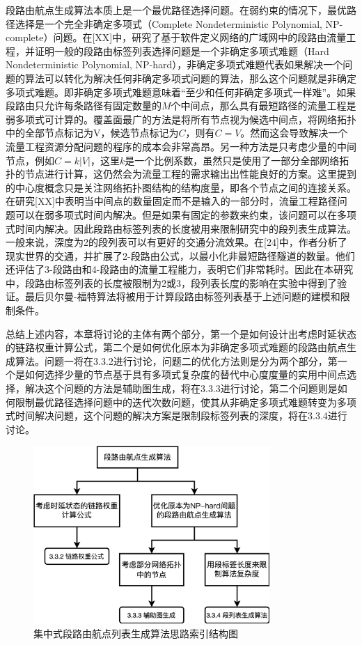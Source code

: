 段路由航点生成算法本质上是一个最优路径选择问题。在弱约束的情况下，最优路径选择是一个完全非确定多项式（Complete Nondeterministic Polynomial, NP-complete）问题。在[XX]中，研究了基于软件定义网络的广域网中的段路由流量工程，并证明一般的段路由标签列表选择问题是一个非确定多项式难题（Hard Nondeterministic Polynomial, NP-hard），非确定多项式难题代表如果解决一个问题的算法可以转化为解决任何非确定多项式问题的算法，那么这个问题就是非确定多项式难题。即非确定多项式难题意味着“至少和任何非确定多项式一样难”。如果段路由只允许每条路径有固定数量的$M$个中间点，那么具有最短路径的流量工程是弱多项式可计算的。覆盖面最广的方法是将所有节点视为候选中间点，将网络拓扑中的全部节点标记为V，候选节点标记为$C$，则有$C = V$。然而这会导致解决一个流量工程资源分配问题的程序的成本会非常高昂。另一种方法是只考虑少量的中间节点，例如$C=k|V|$，这里$k$是一个比例系数，虽然只是使用了一部分全部网络拓扑的节点进行计算，这仍然会为流量工程的需求输出出性能良好的方案。这里提到的中心度概念只是关注网络拓扑图结构的结构度量，即各个节点之间的连接关系。在研究[XX]中表明当中间点的数量固定而不是输入的一部分时，流量工程路径问题可以在弱多项式时间内解决。但是如果有固定的参数来约束，该问题可以在多项式时间内解决。因此段路由标签列表的长度被用来限制研究中的段列表生成算法。一般来说，深度为2的段列表可以有更好的交通分流效果。在[24]中，作者分析了现实世界的交通，并扩展了2-段路由公式，以最小化非最短路径隧道的数量。他们还评估了3-段路由和4-段路由的流量工程能力，表明它们非常耗时。因此在本研究中，段路由标签列表的长度被限制为2或3，段列表长度的影响在实验中得到了验证。最后贝尔曼-福特算法将被用于计算段路由标签列表基于上述问题的建模和限制条件。

总结上述内容，本章将讨论的主体有两个部分，第一个是如何设计出考虑时延状态的链路权重计算公式，第二个是如何优化原本为非确定多项式难题的段路由航点生成算法。问题一将在3.3.2进行讨论，问题二的优化方法则是分为两个部分，第一个是如何选择少量的节点基于具有多项式复杂度的替代中心度度量的实用中间点选择，解决这个问题的方法是辅助图生成，将在3.3.3进行讨论，第二个问题则是如何限制最优路径选择问题中的迭代次数问题，使其从非确定多项式难题转变为多项式时间解决问题，这个问题的解决方案是限制段标签列表的深度，将在3.3.4进行讨论。

\begin{figure}[htbp]
\setlength{\abovecaptionskip}{15pt plus 3pt minus 2pt}
\centerline{\includegraphics[width=0.8\textwidth]{./figures/ch3-ark.png}}
\caption{集中式段路由航点列表生成算法思路索引结构图}
\label{fig-ch3-ark}
\end{figure}

